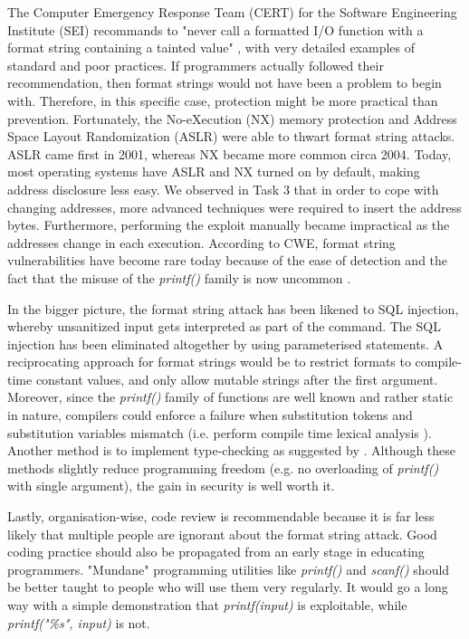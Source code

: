 The Computer Emergency Response Team (CERT) for the Software Engineering Institute (SEI) recommands to "never call a formatted I/O function with a format string containing a tainted value" \cite{burch_cert}, with very detailed examples of standard and poor practices. If programmers actually followed their recommendation, then format strings would not have been a problem to begin with. Therefore, in this specific case, protection might be more practical than prevention. Fortunately, the No-eXecution (NX) memory protection and Address Space Layout Randomization (ASLR) were able to thwart format string attacks. ASLR came first in 2001, whereas NX became more common circa 2004. Today, most operating systems have ASLR and NX turned on by default, making address disclosure less easy. We observed in Task 3 that in order to cope with changing addresses, more advanced techniques were required to insert the address bytes. Furthermore, performing the exploit manually became impractical as the addresses change in each execution. According to CWE, format string vulnerabilities have become rare today because of the ease of detection and the fact that the misuse of the \emph{printf()} family is now uncommon \cite{fsa_cwe}.

In the bigger picture, the format string attack has been likened to SQL injection, whereby unsanitized input gets interpreted as part of the command. The SQL injection has been eliminated altogether by using parameterised statements. A reciprocating approach for format strings would be to restrict formats to compile-time constant values, and only allow mutable strings after the first argument. Moreover, since the \emph{printf()} family of functions are well known and rather static in nature, compilers could enforce a failure when substitution tokens and substitution variables mismatch (i.e. perform compile time lexical analysis \cite{alanpscan}). Another method is to implement type-checking as suggested by \cite{Weitz2014}. Although these methods slightly reduce programming freedom (e.g. no overloading of \emph{printf()} with single argument), the gain in security is well worth it.

Lastly, organisation-wise, code review is recommendable because it is far less likely that multiple people are ignorant about the format string attack. Good coding practice should also be propagated from an early stage in educating programmers. "Mundane" programming utilities like \emph{printf()} and \emph{scanf()} should be better taught to people who will use them very regularly. It would go a long way with a simple demonstration that \emph{printf(input)} is exploitable, while \emph{printf("\%s", input)} is not.